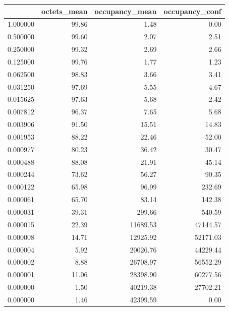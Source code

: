 \begin{tabular}{lrrr}
\toprule
 & octets_mean & occupancy_mean & occupancy_conf \\
\midrule
1.000000 & 99.86 & 1.48 & 0.00 \\
0.500000 & 99.60 & 2.07 & 2.51 \\
0.250000 & 99.32 & 2.69 & 2.66 \\
0.125000 & 99.76 & 1.77 & 1.23 \\
0.062500 & 98.83 & 3.66 & 3.41 \\
0.031250 & 97.69 & 5.55 & 4.67 \\
0.015625 & 97.63 & 5.68 & 2.42 \\
0.007812 & 96.37 & 7.65 & 5.68 \\
0.003906 & 91.50 & 15.51 & 14.83 \\
0.001953 & 88.22 & 22.46 & 52.00 \\
0.000977 & 80.23 & 36.42 & 30.47 \\
0.000488 & 88.08 & 21.91 & 45.14 \\
0.000244 & 73.62 & 56.27 & 90.35 \\
0.000122 & 65.98 & 96.99 & 232.69 \\
0.000061 & 65.70 & 83.14 & 142.38 \\
0.000031 & 39.31 & 299.66 & 540.59 \\
0.000015 & 22.39 & 11689.53 & 47144.57 \\
0.000008 & 14.71 & 12925.92 & 52171.03 \\
0.000004 & 5.92 & 20026.76 & 44229.44 \\
0.000002 & 8.88 & 26708.97 & 56552.29 \\
0.000001 & 11.06 & 28398.90 & 60277.56 \\
0.000000 & 1.50 & 40219.38 & 27702.21 \\
0.000000 & 1.46 & 42399.59 & 0.00 \\
\bottomrule
\end{tabular}
